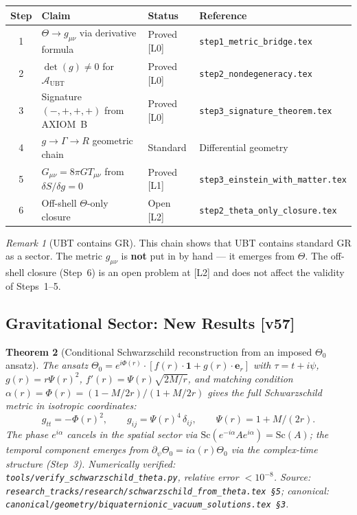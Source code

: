 \documentclass[12pt]{article}
\newtheorem{theorem}{Theorem}[section]
\theoremstyle{definition}
\theoremstyle{remark}
\newtheorem{remark}[theorem]{Remark}
\begin{document}
\begin{center}
\begin{tabular}{clll}
\hline
\textbf{Step} & \textbf{Claim} & \textbf{Status} & \textbf{Reference} \\
\hline
1 & $\Theta \to g_{\mu\nu}$ via derivative formula & Proved [L0] & \texttt{step1\_metric\_bridge.tex} \\
2 & $\det(g) \neq 0$ for $\mathcal{A}_\mathrm{UBT}$ & Proved [L0] & \texttt{step2\_nondegeneracy.tex} \\
3 & Signature $(-,+,+,+)$ from AXIOM~B & Proved [L0] & \texttt{step3\_signature\_theorem.tex} \\
4 & $g \to \Gamma \to R$ geometric chain & Standard & Differential geometry \\
5 & $G_{\mu\nu} = 8\pi G T_{\mu\nu}$ from $\delta S/\delta g = 0$ & Proved [L1] & \texttt{step3\_einstein\_with\_matter.tex} \\
6 & Off-shell $\Theta$-only closure & Open [L2] & \texttt{step2\_theta\_only\_closure.tex} \\
\hline
\end{tabular}
\end{center}

\begin{remark}[UBT contains GR]
This chain shows that UBT contains standard GR as a sector.
The metric $g_{\mu\nu}$ is \textbf{not} put in by hand — it emerges from $\Theta$.
The off-shell closure (Step~6) is an open problem at [L2] and
does not affect the validity of Steps~1--5.
\end{remark}

\subsection{Gravitational Sector: New Results [v57]}
\label{sec:gr_gravity_new}

\begin{theorem}[Conditional Schwarzschild reconstruction from an imposed $\Theta_0$ ansatz]
\label{thm:schwarzschild_canonical}
The ansatz $\Theta_0 = e^{i\Phi(r)}\cdot[f(r)\cdot\mathbf{1}+g(r)\cdot\boldsymbol{e}_r]$
with $\tau = t + i\psi$, $g(r) = r\Psi(r)^2$, $f'(r) = \Psi(r)\sqrt{2M/r}$,
and matching condition $\alpha(r) = \Phi(r) = (1-M/2r)/(1+M/2r)$ gives the
full Schwarzschild metric in isotropic coordinates:
\[
  g_{tt} = -\Phi(r)^2,\qquad g_{ij} = \Psi(r)^4\,\delta_{ij},
  \qquad \Psi(r) = 1 + M/(2r).
\]
The phase $e^{i\alpha}$ cancels in the spatial sector via
$\mathrm{Sc}(e^{-i\alpha}Ae^{i\alpha}) = \mathrm{Sc}(A)$; the temporal
component emerges from $\partial_\psi\Theta_0 = i\alpha(r)\Theta_0$ via
the complex-time structure (Step~3).
Numerically verified: \texttt{tools/verify\_schwarzschild\_theta.py},
relative error $< 10^{-8}$.
Source: \texttt{research\_tracks/research/schwarzschild\_from\_theta.tex §5};
canonical: \texttt{canonical/geometry/biquaternionic\_vacuum\_solutions.tex §3}.
\end{theorem}
\end{document}
